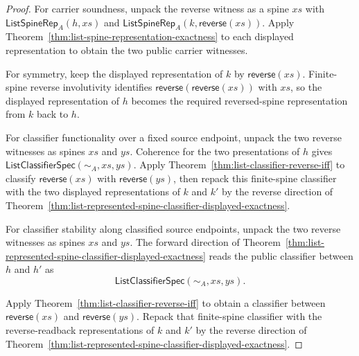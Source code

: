 \begin{proof}
For carrier soundness, unpack the reverse witness as a spine $xs$ with
$\mathsf{ListSpineRep}_A(h,xs)$ and
$\mathsf{ListSpineRep}_A(k,\mathsf{reverse}(xs))$. Apply
Theorem~\ref{thm:list-spine-representation-exactness} to each displayed
representation to obtain the two public carrier witnesses.

For symmetry, keep the displayed representation of $k$ by
$\mathsf{reverse}(xs)$. Finite-spine reverse involutivity identifies
$\mathsf{reverse}(\mathsf{reverse}(xs))$ with $xs$, so the displayed
representation of $h$ becomes the required reversed-spine representation from
$k$ back to $h$.

For classifier functionality over a fixed source endpoint, unpack the two
reverse witnesses as spines $xs$ and $ys$. Coherence for the two presentations
of $h$ gives $\mathsf{ListClassifierSpec}(\sim_A,xs,ys)$. Apply
Theorem~\ref{thm:list-classifier-reverse-iff} to classify
$\mathsf{reverse}(xs)$ with $\mathsf{reverse}(ys)$, then repack this
finite-spine classifier with the two displayed representations of $k$ and $k'$
by the reverse direction of
Theorem~\ref{thm:list-represented-spine-classifier-displayed-exactness}.

For classifier stability along classified source endpoints, unpack the two
reverse witnesses as spines $xs$ and $ys$. The forward direction of
Theorem~\ref{thm:list-represented-spine-classifier-displayed-exactness} reads
the public classifier between $h$ and $h'$ as
$$
\mathsf{ListClassifierSpec}(\sim_A,xs,ys).
$$

Apply Theorem~\ref{thm:list-classifier-reverse-iff} to obtain a classifier
between $\mathsf{reverse}(xs)$ and $\mathsf{reverse}(ys)$. Repack that
finite-spine classifier with the reverse-readback representations of $k$ and
$k'$ by the reverse direction of
Theorem~\ref{thm:list-represented-spine-classifier-displayed-exactness}.
\end{proof}

